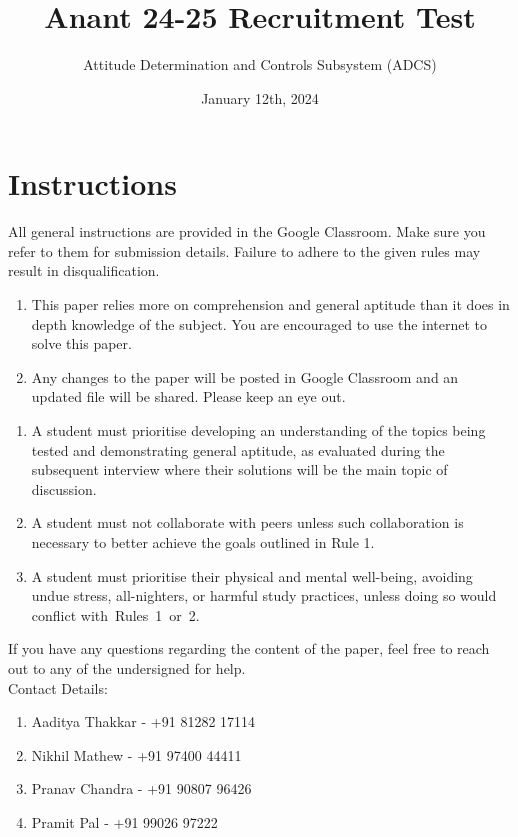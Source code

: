 \documentclass[a4paper, 12pt]{exam}
\begin{document}
	\title{Anant 24-25 Recruitment Test}
	\author{Attitude Determination and Controls Subsystem (ADCS)}
	\date{January 12th, 2024}
	\maketitle
	
	\section*{Instructions}
	All general instructions are provided in the Google Classroom. Make sure you refer to them for submission details. Failure to adhere to the given rules may result in disqualification. 
	\begin{enumerate}[]
		\item This paper relies more on comprehension and general aptitude than it does in depth knowledge of the subject. You are encouraged to use the internet to solve this paper.
		\item Any changes to the paper will be posted in Google Classroom and an updated file will be shared. Please keep an eye out.
	\end{enumerate} 
	
	\bigskip

	\begin{enumerate}[label = \textbf{Rule \arabic* }:, leftmargin=5em]
		\item A student must prioritise developing an understanding of the topics being tested and demonstrating general aptitude, as evaluated during the subsequent interview where their solutions will be the main topic of discussion.
		
		\item A student must not collaborate with peers unless such collaboration is necessary to better achieve the goals outlined in Rule 1.
		
		\item A student must prioritise their physical and mental well-being, avoiding undue stress, all-nighters, or harmful study practices, unless doing so would conflict with Rules 1 or 2.
		
			\end{enumerate}
		
If you have any questions regarding the content of the paper, feel free to reach out to any of the undersigned for help. \\

Contact Details:
		\begin{enumerate}
			\item Aaditya Thakkar - +91 81282 17114
			\item Nikhil Mathew - +91 97400 44411
			\item Pranav Chandra - +91 90807 96426
			\item Pramit Pal - +91 99026 97222
		\end{enumerate}
\end{document}

